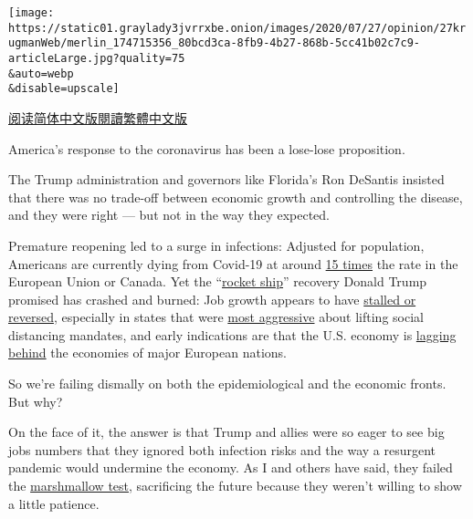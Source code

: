 \texttt{[image: https://static01.graylady3jvrrxbe.onion/images/2020/07/27/opinion/27krugmanWeb/merlin\_174715356\_80bcd3ca-8fb9-4b27-868b-5cc41b02c7c9-articleLarge.jpg?quality=75\\\&auto=webp\\\&disable=upscale]}

\href{https://cn.nytimes3xbfgragh.onion/opinion/20200728/us-republicans-coronavirus/}{阅读简体中文版}\href{https://cn.nytimes3xbfgragh.onion/opinion/20200728/us-republicans-coronavirus/zh-hant/}{閱讀繁體中文版}

America's response to the coronavirus has been a lose-lose proposition.

The Trump administration and governors like Florida's Ron DeSantis
insisted that there was no trade-off between economic growth and
controlling the disease, and they were right --- but not in the way they
expected.

Premature reopening led to a surge in infections: Adjusted for
population, Americans are currently dying from Covid-19 at around
\href{https://ourworldindata.org/coronavirus-data-explorer?zoomToSelection=true\&deathsMetric=true\&dailyFreq=true\&perCapita=true\&smoothing=7\&country=USA~CAN~EuropeanUnion\&pickerMetric=location\&pickerSort=asc}{15
times} the rate in the European Union or Canada. Yet the
``\href{https://www.nytimes3xbfgragh.onion/2020/07/01/business/economic-recovery-virus-surge.html}{rocket
ship}'' recovery Donald Trump promised has crashed and burned: Job
growth appears to have
\href{https://twitter.com/ernietedeschi/status/1286740199796596743}{stalled
or reversed}, especially in states that were
\href{https://www.washingtonpost.com/business/2020/07/21/arizona-struggles-neighboring-new-mexico-found-more-cautious-path-sustained-growth/}{most
aggressive} about lifting social distancing mandates, and early
indications are that the U.S. economy is
\href{https://www.bloomberg.com/news/articles/2020-07-26/europe-s-economy-set-to-outpace-u-s-in-upending-of-past-roles?srnd=premium\&sref=qzusa8bC}{lagging
behind} the economies of major European nations.

So we're failing dismally on both the epidemiological and the economic
fronts. But why?

On the face of it, the answer is that Trump and allies were so eager to
see big jobs numbers that they ignored both infection risks and the way
a resurgent pandemic would undermine the economy. As I and others have
said, they failed the
\href{https://www.nytimes3xbfgragh.onion/2020/06/09/opinion/coronavirus-reopening-marshmallow-test.html}{marshmallow
test}, sacrificing the future because they weren't willing to show a
little patience.

